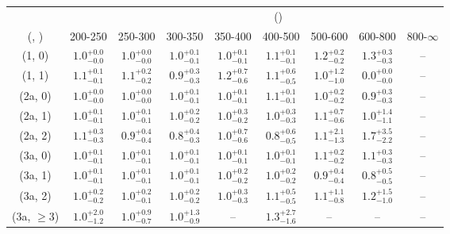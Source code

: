 \begin{table}[h!]
\tiny
\centering
{}
\begin{tabular}
{ccccccccc}
	\hline\hline
&	& \multicolumn{8}{c}{\scalht (\gev)} \\ 
	 (\njet,  \nb) & 200-250 & 250-300 & 300-350 & 350-400 & 400-500 & 500-600 & 600-800 & 800-$\infty$ \\ [0.8ex] 
\hline
	(1, 0) & $1.0^{+ 0.0 }_{- 0.0 }$ & $1.0^{+ 0.0 }_{- 0.0 }$ & $1.0^{+ 0.1 }_{- 0.1 }$ & $1.0^{+ 0.1 }_{- 0.1 }$ & $1.1^{+ 0.1 }_{- 0.1 }$ & $1.2^{+ 0.2 }_{- 0.2 }$ & $1.3^{+ 0.3 }_{- 0.3 }$ & -- \\[0.5ex] 
	(1, 1) & $1.1^{+ 0.1 }_{- 0.1 }$ & $1.1^{+ 0.2 }_{- 0.2 }$ & $0.9^{+ 0.3 }_{- 0.3 }$ & $1.2^{+ 0.7 }_{- 0.6 }$ & $1.1^{+ 0.6 }_{- 0.5 }$ & $1.0^{+ 1.2 }_{- 1.0 }$ & $0.0^{+ 0.0 }_{- 0.0 }$ & -- \\[0.5ex] 
	(2a, 0) & $1.0^{+ 0.0 }_{- 0.0 }$ & $1.0^{+ 0.0 }_{- 0.0 }$ & $1.0^{+ 0.1 }_{- 0.1 }$ & $1.0^{+ 0.1 }_{- 0.1 }$ & $1.1^{+ 0.1 }_{- 0.1 }$ & $1.0^{+ 0.2 }_{- 0.2 }$ & $0.9^{+ 0.3 }_{- 0.3 }$ & -- \\[0.5ex] 
	(2a, 1) & $1.0^{+ 0.1 }_{- 0.1 }$ & $1.0^{+ 0.1 }_{- 0.1 }$ & $1.0^{+ 0.2 }_{- 0.2 }$ & $1.0^{+ 0.3 }_{- 0.2 }$ & $1.0^{+ 0.3 }_{- 0.3 }$ & $1.1^{+ 0.7 }_{- 0.6 }$ & $1.0^{+ 1.4 }_{- 1.1 }$ & -- \\[0.5ex] 
	(2a, 2) & $1.1^{+ 0.3 }_{- 0.3 }$ & $0.9^{+ 0.4 }_{- 0.4 }$ & $0.8^{+ 0.4 }_{- 0.3 }$ & $1.0^{+ 0.7 }_{- 0.6 }$ & $0.8^{+ 0.6 }_{- 0.5 }$ & $1.1^{+ 2.1 }_{- 1.3 }$ & $1.7^{+ 3.5 }_{- 2.2 }$ & -- \\[0.5ex] 
	(3a, 0) & $1.0^{+ 0.1 }_{- 0.1 }$ & $1.0^{+ 0.1 }_{- 0.1 }$ & $1.0^{+ 0.1 }_{- 0.1 }$ & $1.0^{+ 0.1 }_{- 0.1 }$ & $1.0^{+ 0.1 }_{- 0.1 }$ & $1.1^{+ 0.2 }_{- 0.2 }$ & $1.1^{+ 0.3 }_{- 0.3 }$ & -- \\[0.5ex] 
	(3a, 1) & $1.0^{+ 0.1 }_{- 0.1 }$ & $1.0^{+ 0.1 }_{- 0.1 }$ & $1.0^{+ 0.1 }_{- 0.1 }$ & $1.0^{+ 0.2 }_{- 0.2 }$ & $1.0^{+ 0.2 }_{- 0.2 }$ & $0.9^{+ 0.4 }_{- 0.4 }$ & $0.8^{+ 0.5 }_{- 0.5 }$ & -- \\[0.5ex] 
	(3a, 2) & $1.0^{+ 0.2 }_{- 0.2 }$ & $1.0^{+ 0.2 }_{- 0.1 }$ & $1.0^{+ 0.2 }_{- 0.2 }$ & $1.0^{+ 0.3 }_{- 0.3 }$ & $1.1^{+ 0.5 }_{- 0.5 }$ & $1.1^{+ 1.1 }_{- 0.8 }$ & $1.2^{+ 1.5 }_{- 1.0 }$ & -- \\[0.5ex] 
	(3a, $\ge3$) & $1.0^{+ 2.0 }_{- 1.2 }$ & $1.0^{+ 0.9 }_{- 0.7 }$ & $1.0^{+ 1.3 }_{- 0.9 }$ & -- & $1.3^{+ 2.7 }_{- 1.6 }$ & -- & -- & -- \\[0.5ex] 

\end{tabular}
\end{table}
